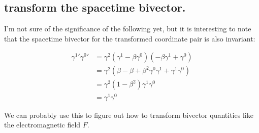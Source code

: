 \subsection{transform the spacetime bivector. }

I'm not sure of the significance of the following yet, but it is interesting to note that the spacetime bivector for the transformed coordinate
pair is also invariant:

\begin{align*}
{\gamma^1}' {\gamma^0}'
&= \gamma^2 (\gamma^1 -\beta \gamma^0) (-\beta \gamma^1 + \gamma^0 ) \\
&= \gamma^2 (\beta -\beta +\beta^2 \gamma^0 \gamma^1 + \gamma^1 \gamma^0) \\
&= \gamma^2 (1-\beta^2) \gamma^1 \gamma^0 \\
&= \gamma^1 \gamma^0 
\end{align*}

We can probably use this to figure out how to transform bivector quantities like the electromagnetic field $F$.
